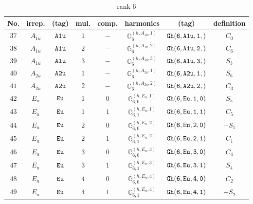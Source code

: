 \documentclass[fleqn,8pt]{jsarticle}
\begin{document}
\begin{table}[ht!]
\begin{center}
\caption{rank 6}
\renewcommand{\arraystretch}{1.3}
\begin{tabular}{cccccccc} \hline \hline
No. & irrep. & (tag) & mul. & comp. & harmonics & (tag) & definition \\ \hline
$ 37 $ & $ A_{1u} $ & $ {\tt A1u} $ & $ 1 $ & $ - $ & $ \mathbb{G}_{6}^{(h,A_{1u},1)} $ & $ {\tt Gh(6,A1u,1,)} $ & $ C_{0} $ \\
$ 38 $ & $ A_{1u} $ & $ {\tt A1u} $ & $ 2 $ & $ - $ & $ \mathbb{G}_{6}^{(h,A_{1u},2)} $ & $ {\tt Gh(6,A1u,2,)} $ & $ C_{6} $ \\
$ 39 $ & $ A_{1u} $ & $ {\tt A1u} $ & $ 3 $ & $ - $ & $ \mathbb{G}_{6}^{(h,A_{1u},3)} $ & $ {\tt Gh(6,A1u,3,)} $ & $ S_{3} $ \\
$ 40 $ & $ A_{2u} $ & $ {\tt A2u} $ & $ 1 $ & $ - $ & $ \mathbb{G}_{6}^{(h,A_{2u},1)} $ & $ {\tt Gh(6,A2u,1,)} $ & $ S_{6} $ \\
$ 41 $ & $ A_{2u} $ & $ {\tt A2u} $ & $ 2 $ & $ - $ & $ \mathbb{G}_{6}^{(h,A_{2u},2)} $ & $ {\tt Gh(6,A2u,2,)} $ & $ C_{3} $ \\
$ 42 $ & $ E_{u} $ & $ {\tt Eu} $ & $ 1 $ & $ 0 $ & $ \mathbb{G}_{6,0}^{(h,E_{u},1)} $ & $ {\tt Gh(6,Eu,1,0)} $ & $ S_{5} $ \\
$ 43 $ & $ E_{u} $ & $ {\tt Eu} $ & $ 1 $ & $ 1 $ & $ \mathbb{G}_{6,1}^{(h,E_{u},1)} $ & $ {\tt Gh(6,Eu,1,1)} $ & $ C_{5} $ \\
$ 44 $ & $ E_{u} $ & $ {\tt Eu} $ & $ 2 $ & $ 0 $ & $ \mathbb{G}_{6,0}^{(h,E_{u},2)} $ & $ {\tt Gh(6,Eu,2,0)} $ & $ - S_{1} $ \\
$ 45 $ & $ E_{u} $ & $ {\tt Eu} $ & $ 2 $ & $ 1 $ & $ \mathbb{G}_{6,1}^{(h,E_{u},2)} $ & $ {\tt Gh(6,Eu,2,1)} $ & $ C_{1} $ \\
$ 46 $ & $ E_{u} $ & $ {\tt Eu} $ & $ 3 $ & $ 0 $ & $ \mathbb{G}_{6,0}^{(h,E_{u},3)} $ & $ {\tt Gh(6,Eu,3,0)} $ & $ C_{4} $ \\
$ 47 $ & $ E_{u} $ & $ {\tt Eu} $ & $ 3 $ & $ 1 $ & $ \mathbb{G}_{6,1}^{(h,E_{u},3)} $ & $ {\tt Gh(6,Eu,3,1)} $ & $ S_{4} $ \\
$ 48 $ & $ E_{u} $ & $ {\tt Eu} $ & $ 4 $ & $ 0 $ & $ \mathbb{G}_{6,0}^{(h,E_{u},4)} $ & $ {\tt Gh(6,Eu,4,0)} $ & $ C_{2} $ \\
$ 49 $ & $ E_{u} $ & $ {\tt Eu} $ & $ 4 $ & $ 1 $ & $ \mathbb{G}_{6,1}^{(h,E_{u},4)} $ & $ {\tt Gh(6,Eu,4,1)} $ & $ - S_{2} $ \\
 \hline \hline
\end{tabular}
\end{center}
\end{table}
\end{document}
